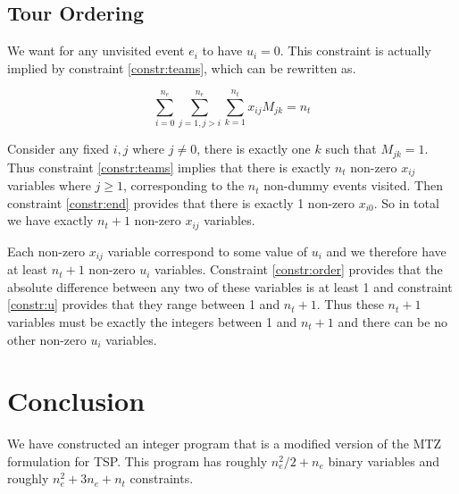 \documentclass[11pt]{article}
\begin{document}
\subsection{Tour Ordering}
We want for any unvisited event $e_i$ to have $u_i = 0$. This constraint is actually implied by constraint \eqref{constr:teams}, which can be rewritten as.

\begin{equation}
    \sum_{i=0}^{n_e} \sum_{j = 1, j > i}^{n_e} \sum_{k=1}^{n_t} x_{ij} M_{jk} = n_t
\end{equation}

Consider any fixed $i, j$ where $j \neq 0$, there is exactly one $k$ such that $M_{jk} = 1$. Thus constraint \eqref{constr:teams} implies that there is exactly $n_t$ non-zero $x_{ij}$ variables where $j \geq 1$, corresponding to the $n_t$ non-dummy events visited. Then constraint \eqref{constr:end} provides that there is exactly 1 non-zero $x_{i0}$. So in total we have exactly $n_t + 1$ non-zero $x_{ij}$ variables.

Each non-zero $x_{ij}$ variable correspond to some value of $u_i$ and we therefore have at least $n_t + 1$ non-zero $u_i$ variables. Constraint \eqref{constr:order} provides that the absolute difference between any two of these variables is at least 1 and constraint \eqref{constr:u} provides that they range between 1 and $n_t + 1$. Thus these $n_t + 1$ variables must be exactly the integers between 1 and $n_t + 1$ and there can be no other non-zero $u_i$ variables.

\section{Conclusion}
We have constructed an integer program that is a modified version of the MTZ formulation for TSP. This program has roughly $n_e^2 / 2 + n_e$ binary variables and roughly $n_e^2 + 3n_e + n_t$ constraints.
\end{document}
